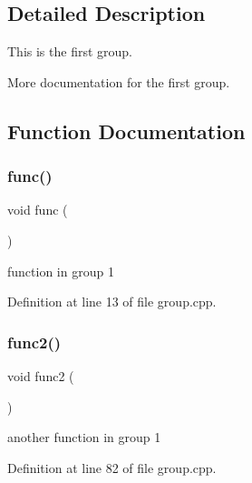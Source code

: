 \subsection{Detailed Description}
This is the first group. 

More documentation for the first group.

\subsection{Function Documentation}
\mbox{\label{group__group1_ga24f647174760cac13d2624b5ad74b00c}} 
\subsubsection{\texorpdfstring{func()}{func()}}
{\footnotesize\ttfamily void func (\begin{DoxyParamCaption}{ }\end{DoxyParamCaption})}



function in group 1 



Definition at line 13 of file group.\+cpp.


\begin{DoxyCode}{0}

\end{DoxyCode}
\mbox{\label{group__group1_ga053929c0809a5f56f7548fd7d9968f31}} 
\subsubsection{\texorpdfstring{func2()}{func2()}}
{\footnotesize\ttfamily void func2 (\begin{DoxyParamCaption}{ }\end{DoxyParamCaption})}



another function in group 1 



Definition at line 82 of file group.\+cpp.


\begin{DoxyCode}{0}

\end{DoxyCode}
\mbox{\label{group__group1_gadbf675591ff057ec48ce35b0d5cdf755}} 
